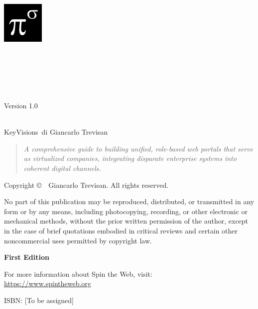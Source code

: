 \begin{titlepage}
\centering

\includegraphics[width=0.15\textwidth]{figures/logo.png}\\[1cm]

\vspace*{1cm}

\makeatletter
{\Huge\bfseries \@title\\[0.5cm]}

\ifx\@subtitle\@empty\else
{\Large \@subtitle\\[1.5cm]}
\fi

{\large\textsc{\@author}\\[2cm]}

{\large Version 1.0\\[0.5cm]}
{\large \@date\\[2cm]}
\makeatother

\vfill

{\large KeyVisions\texttrademark\ di Giancarlo Trevisan\\[0.5cm]}

\begin{quote}
\centering
\textit{A comprehensive guide to building unified, role-based web portals that serve as virtualized companies, integrating disparate enterprise systems into coherent digital channels.}
\end{quote}

\end{titlepage}

\thispagestyle{empty}
\null\vfill
\noindent
\thispagestyle{empty}
\vspace*{\fill}
\begin{center}
\small
Copyright \copyright\ \the\year\ Giancarlo Trevisan. All rights reserved.

\medskip

\noindent
No part of this publication may be reproduced, distributed, or transmitted in any form or by any means, including photocopying, recording, or other electronic or mechanical methods, without the prior written permission of the author, except in the case of brief quotations embodied in critical reviews and certain other noncommercial uses permitted by copyright law.

\medskip

\noindent
\textbf{First Edition}

\medskip

\noindent
For more information about Spin the Web, visit: \\
\url{https://www.spintheweb.org}

\medskip

\noindent
ISBN: [To be assigned]
\end{center}

\clearpage
